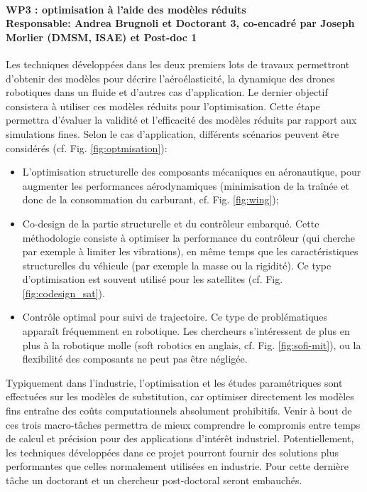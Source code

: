 \documentclass[12pt, french]{article}
\begin{document}
\paragraph{\large WP3 : optimisation à l'aide des modèles réduits\\
	Responsable: Andrea Brugnoli et Doctorant 3, co-encadré par Joseph Morlier (DMSM, ISAE) et Post-doc 1\\}

Les techniques développées dans les deux premiers lots de travaux permettront d'obtenir des modèles pour décrire l'aéroélasticité, la dynamique des drones robotiques dans un fluide et d'autres cas d'application.
Le dernier objectif consistera à utiliser ces modèles réduits pour l'optimisation. Cette étape permettra d'évaluer la validité et l'efficacité des modèles réduits par rapport aux simulations fines. Selon le cas d'application, différents scénarios peuvent être considérés (cf. Fig. \ref{fig:optmisation}): 
\begin{itemize}
	\item L'optimisation structurelle des composants mécaniques en aéronautique, pour augmenter les performances aérodynamiques (minimisation de la traînée et donc de la consommation du carburant, cf. Fig. \ref{fig:wing}); 
	\item Co-design de la partie structurelle et du contrôleur embarqué. Cette méthodologie consiste à optimiser la performance du contrôleur (qui cherche par exemple à limiter les vibrations), en même temps que les caractéristiques structurelles du véhicule (par exemple la masse ou la rigidité). Ce type d'optimisation est souvent utilisé pour les satellites (cf. Fig. \ref{fig:codesign_sat}).
	\item Contrôle optimal pour suivi de trajectoire. Ce type de problématiques apparaît fréquemment en robotique. Les chercheurs s'intéressent de plus en plus à la robotique molle (soft robotics en anglais, cf. Fig. \ref{fig:sofi-mit}), ou la flexibilité des composants ne peut pas être négligée.
\end{itemize}

Typiquement dans l'industrie, l'optimisation et les études paramétriques sont effectuées sur les
modèles de substitution, car optimiser directement les modèles fins entraîne des coûts computationnels absolument prohibitifs. Venir à bout de ces trois macro-tâches permettra de mieux comprendre le compromis entre temps de calcul et précision pour des applications d'intérêt industriel. Potentiellement, les techniques développées dans ce projet pourront fournir des solutions plus performantes que celles normalement utilisées en industrie. Pour cette dernière t\^ache un doctorant et un chercheur post-doctoral seront embauchés. 
\end{document}
